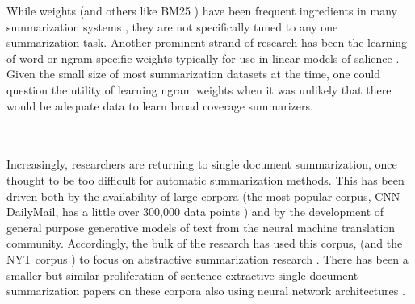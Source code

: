 While \tfidf weights (and others like BM25 \citep{bm25}) have been frequent
ingredients in many summarization systems \citep{a,b,c,d,e}, they are 
not specifically tuned to any one summarization task. Another prominent
strand of research has been the learning of word or ngram specific weights
typically for use in linear models of salience \citep{martins2009summarization,woodsend2010automatic,berg2011jointly,durrett2016learning}. 
Given the small size of most summarization datasets at the time, one could question 
the utility of learning ngram weights when it was unlikely that there 
would be adequate data to learn broad coverage summarizers.



~~\\
~\\






Increasingly, researchers are returning to single document summarization,
once thought to be too difficult for automatic summarization methods.
This has been driven both by the availability of large corpora (the
most popular corpus, CNN-DailyMail, has a little over 300,000 data points
\citep{see2017get}) and by the development of general purpose 
generative models of text from the neural machine translation community.
Accordingly, the bulk of the research has used this corpus, (and the NYT
corpus \citep{sandhaus2008new}) to focus on abstractive summarization
research \citep{rush2015neural,chopra2016abstractive,cheng2016neural,nallapati2016abstractive,see2017get,paulus2017deep}. 
There has been a smaller but similar proliferation of sentence
extractive single document summarization papers on these corpora also using 
neural network architectures \citep{cheng2016neural,nallapati2016classify,nallapati2016abstractive,narayan2018ranking}.


